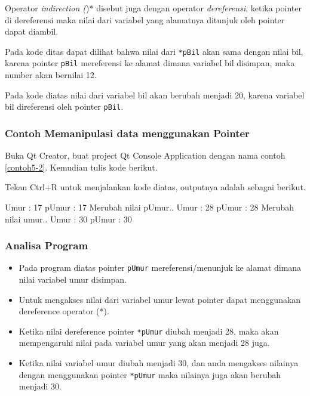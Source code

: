 Operator \emph{indirection (})* disebut juga dengan operator
\emph{dereferensi}, ketika pointer di dereferensi maka nilai dari
variabel yang alamatnya ditunjuk oleh pointer dapat diambil.



Pada kode ditas dapat dilihat bahwa nilai dari \texttt{*pBil} akan sama
dengan nilai bil, karena pointer \texttt{pBil} mereferensi ke alamat
dimana variabel bil disimpan, maka number akan bernilai 12.



Pada kode diatas nilai dari variabel bil akan berubah menjadi 20, karena
variabel bil direferensi oleh pointer \texttt{pBil}.

\subsubsection*{Contoh  Memanipulasi data menggunakan Pointer}

Buka Qt Creator, buat project Qt Console Application dengan nama contoh
\ref{contoh5-2}. Kemudian tulis kode berikut.



Tekan Ctrl+R untuk menjalankan kode diatas, outputnya adalah sebagai
berikut.

\begin{lcverbatim}
Umur : 17
pUmur : 17
Merubah nilai pUmur..
Umur : 28
pUmur : 28
Merubah nilai umur..
Umur : 30
pUmur : 30
\end{lcverbatim}

\subsubsection*{Analisa Program}

\begin{itemize}

\item
  Pada program diatas pointer \texttt{pUmur} mereferensi/menunjuk ke
  alamat dimana nilai variabel umur disimpan.
\item
  Untuk mengakses nilai dari variabel umur lewat pointer dapat
  menggunakan dereference operator (*).
\item
  Ketika nilai dereference pointer \texttt{*pUmur} diubah menjadi 28,
  maka akan mempengaruhi nilai pada variabel umur yang akan menjadi 28
  juga.
\item
  Ketika nilai variabel umur diubah menjadi 30, dan anda mengakses
  nilainya dengan menggunakan pointer \texttt{*pUmur} maka nilainya juga
  akan berubah menjadi 30.
\end{itemize}

